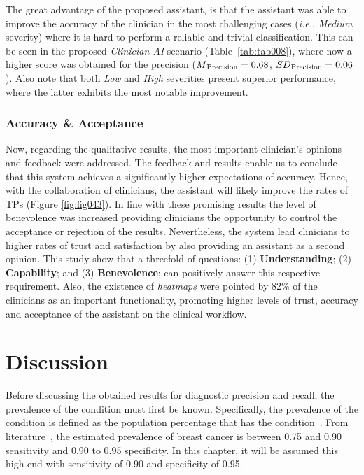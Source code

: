 

The great advantage of the proposed assistant, is that the assistant was able to improve the accuracy of the clinician in the most challenging cases ({\it i.e.}, {\it Medium} severity) where it is hard to perform a reliable and trivial classification.
This can be seen in the proposed {\it Clinician-AI} scenario (Table~\ref{tab:tab008}), where now a higher score was obtained for the precision ($M\textsubscript{Precision} = 0.68$, $SD\textsubscript{Precision} = 0.06$).
Also note that both {\it Low} and {\it High} severities present superior performance, where the latter exhibits the most notable improvement.

\subsubsection{Accuracy \& Acceptance}
\label{sec:sec006006004002}

Now, regarding the qualitative results, the most important clinician's opinions and feedback were addressed.
The feedback and results enable us to conclude that this system achieves a significantly higher expectations of accuracy.
Hence, with the collaboration of clinicians, the assistant will likely improve the rates of \acp{TP} (Figure \ref{fig:fig043}).
In line with these promising results the level of benevolence was increased providing clinicians the opportunity to control the acceptance or rejection of the results.
Nevertheless, the system lead clinicians to higher rates of trust and satisfaction by also providing an assistant as a second opinion.
This study show that a threefold of questions: (1) {\bf Understanding}; (2) {\bf Capability}; and (3) {\bf Benevolence}; can positively answer this respective requirement.
Also, the existence of {\it heatmaps} were pointed by 82\% of the clinicians as an important functionality, promoting higher levels of trust, accuracy and acceptance of the assistant on the clinical workflow.

\section{Discussion}
\label{sec:sec006007}

Before discussing the obtained results for diagnostic precision and recall, the prevalence of the condition must first be known.
Specifically, the prevalence of the condition is defined as the population percentage that has the condition~\cite{chkotua2017peer}.
From literature~\cite{doi:10.1002/ijc.27711}, the estimated prevalence of breast cancer is between 0.75 and 0.90 sensitivity and 0.90 to 0.95 specificity.
In this chapter, it will be assumed this high end with sensitivity of 0.90 and specificity of 0.95.

